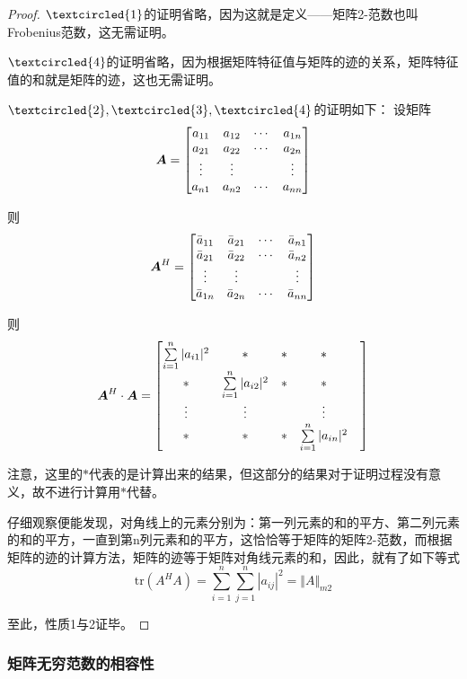 \documentclass[12pt, a4paper, oneside, UTF8]{ctexbook}
\begin{document}
\begin{proof}

    $\textcircled{1}$的证明省略，因为这就是定义——矩阵2-范数也叫Frobenius范数，这无需证明。

    $\textcircled{4}$的证明省略，因为根据矩阵特征值与矩阵的迹的关系，矩阵特征值的和就是矩阵的迹，这也无需证明。

    $\textcircled{2},\textcircled{3},\textcircled{4}$的证明如下：
    设矩阵\[\boldsymbol{A}=\begin{bmatrix}
        a_{11}&a_{12}&\cdots&a_{1n}\\
        a_{21}&a_{22}&\cdots&a_{2n}\\
        \vdots&\vdots&&\vdots\\
        a_{n1}&a_{n2}&\cdots&a_{nn}
    \end{bmatrix}\]
    
    则\[\boldsymbol{A}^H=\begin{bmatrix}
        \bar{a}_{11}&\bar{a}_{21}&\cdots&\bar{a}_{n1}\\
        \bar{a}_{21}&\bar{a}_{22}&\cdots&\bar{a}_{n2}\\
        \vdots&\vdots&&\vdots\\
        \bar{a}_{1n}&\bar{a}_{2n}&\cdots&\bar{a}_{nn}\\
    \end{bmatrix}\]

    则\[\boldsymbol{A}^H\cdot \boldsymbol{A}=\begin{bmatrix}
        \sum\limits_{i=1}^n|a_{i1}|^2&*&*&*\\
        *&\sum\limits_{i=1}^n|a_{i2}|^2&*&*&\\
        \vdots&\vdots&&\vdots\\
        *&*&*&\sum\limits_{i=1}^n|a_{in}|^2\\
    \end{bmatrix}\]
    \begin{rmk}
        注意，这里的$*$代表的是计算出来的结果，但这部分的结果对于证明过程没有意义，故不进行计算用$*$代替。
    \end{rmk}

    仔细观察便能发现，对角线上的元素分别为：第一列元素的和的平方、第二列元素的和的平方，一直到第n列元素和的平方，这恰恰等于矩阵的矩阵2-范数，而根据矩阵的迹的计算方法，矩阵的迹等于矩阵对角线元素的和，因此，就有了如下等式\[\text{tr}(A^HA)=\sum_{i=1}^{n}\sum_{j=1}^{n}|a_{ij}|^2=\Vert A\Vert_{m2}\]

    至此，性质1与2证毕。
\end{proof}
\subsubsection{矩阵无穷范数的相容性}
\end{document}
